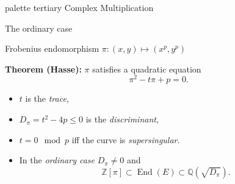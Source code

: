 \documentclass[aspectratio=169]{beamer}
\newcommand{\Z}{ℤ}
\newcommand{\Q}{ℚ}
\newcommand{\End}{\operatorname{End}}
\begin{document}

\begin{frame}[plain]
  \begin{beamercolorbox}[sep=0.1px,center,wd=\paperwidth,sep=0.5\paperheight]{palette tertiary}
    \Huge\centering Complex Multiplication
  \end{beamercolorbox}
\end{frame}


\begin{frame}{The ordinary case}
  \begin{block}{Frobenius endomorphism}
    \large\centering
    $π : (x,y) ↦ (x^p, y^p)$
  \end{block}

  \textbf{Theorem (Hasse):}
  $\pi$ satisfies a quadratic equation
  \[\pi^2 - t\pi + p = 0.\]
  
  \begin{itemize}
  \item \emph{$t$} is the \emph{trace},
  \item \emph{$D_\pi=t^2-4p\le 0$} is  the \emph{discriminant},
  \item \emph{$t=0\mod p$} iff the curve is \emph{supersingular}.
  \item In the \emph{ordinary case} $D_\pi\ne 0$ and
    \[\Z[\pi] \subset \End(E) \subset \Q(\sqrt{D_\pi}).\]
  \end{itemize}
\end{frame}

\end{document}
